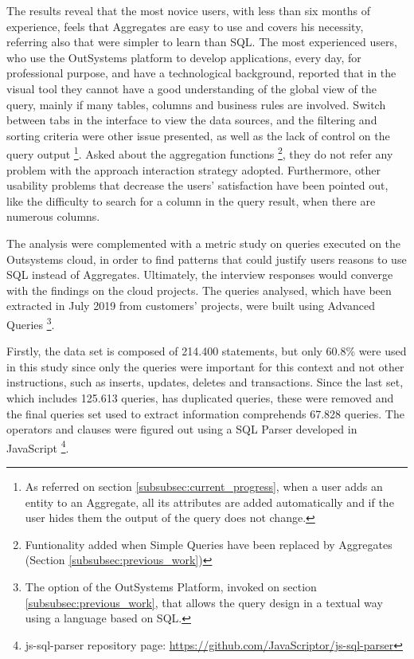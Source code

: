 The results reveal that the most novice users, with less than six months of experience, feels that Aggregates are easy to use and covers his necessity, referring also that were simpler to learn than SQL. The most experienced users, who use the OutSystems platform to develop applications, every day, for professional purpose, and have a technological background, reported that in the visual tool they cannot have a good understanding of the global view of the query, mainly if many tables, columns and business rules are involved. Switch between tabs in the interface to view the data sources, and the filtering and sorting criteria were other issue presented, as well as the lack of control on the query output \footnote{As referred on section \ref{subsubsec:current_progress}, when a user adds an entity to an Aggregate, all its attributes are added automatically and if the user hides them the output of the query does not change.}. Asked about the aggregation functions \footnote{Funtionality added when Simple Queries have been replaced by Aggregates (Section \ref{subsubsec:previous_work})}, they do not refer any problem with the approach interaction strategy adopted. Furthermore, other usability problems that decrease the users’ satisfaction have been pointed out, like the difficulty to search for a column in the query result, when there are numerous columns.

The analysis were complemented with a metric study on queries executed on the Outsystems cloud, in order to find patterns that could justify users reasons to use SQL instead of Aggregates. Ultimately, the interview responses would converge with the findings on the cloud projects. The queries analysed, which have been extracted in July 2019 from customers’ projects, were built using Advanced Queries \footnote{The option of the OutSystems Platform, invoked on section \ref{subsubsec:previous_work}, that allows the query design in a textual way using a language based on SQL.}.

Firstly, the data set is composed of 214.400 statements, but only 60.8\% were used in this study since only the queries were important for this context and not other instructions, such as inserts, updates, deletes and transactions. Since the last set, which includes 125.613 queries, has duplicated queries, these were removed and the final queries set used to extract information comprehends 67.828 queries. The operators and clauses were figured out using a SQL Parser developed in JavaScript \footnote{js-sql-parser repository page: \url{https://github.com/JavaScriptor/js-sql-parser}}.

